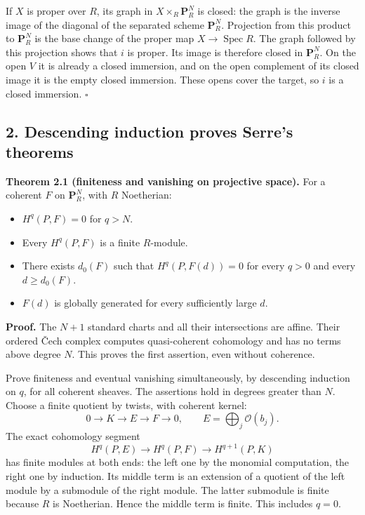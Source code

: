 \documentclass[11pt]{article}
\providecommand{\tightlist}{\setlength{\itemsep}{0pt}\setlength{\parskip}{0pt}}
\begin{document}
If \(X\) is proper over \(R\), its graph in \(X\times_R\mathbf P_R^N\)
is closed: the graph is the inverse image of the diagonal of the
separated scheme \(\mathbf P_R^N\). Projection from this product to
\(\mathbf P_R^N\) is the base change of the proper map
\(X\to\operatorname{Spec}R\). The graph followed by this projection
shows that \(i\) is proper. Its image is therefore closed in
\(\mathbf P_R^N\). On the open \(V\) it is already a closed immersion,
and on the open complement of its closed image it is the empty closed
immersion. These opens cover the target, so \(i\) is a closed immersion.
\(\square\)

\subsection{2. Descending induction proves Serre's
theorems}\label{descending-induction-proves-serres-theorems}

\textbf{Theorem 2.1 (finiteness and vanishing on projective space).} For
a coherent \(F\) on \(\mathbf P_R^N\), with \(R\) Noetherian:

\begin{itemize}
\tightlist
\item
  \(H^q(P,F)=0\) for \(q>N\).
\item
  Every \(H^q(P,F)\) is a finite \(R\)-module.
\item
  There exists \(d_0(F)\) such that \(H^q(P,F(d))=0\) for every \(q>0\)
  and every \(d\ge d_0(F)\).
\item
  \(F(d)\) is globally generated for every sufficiently large \(d\).
\end{itemize}

\textbf{Proof.} The \(N+1\) standard charts and all their intersections
are affine. Their ordered Čech complex computes quasi-coherent
cohomology and has no terms above degree \(N\). This proves the first
assertion, even without coherence.

Prove finiteness and eventual vanishing simultaneously, by descending
induction on \(q\), for all coherent sheaves. The assertions hold in
degrees greater than \(N\). Choose a finite quotient by twists, with
coherent kernel: \[
0\longrightarrow K\longrightarrow E\longrightarrow F\longrightarrow0,
\qquad E=\bigoplus_j\mathcal O(b_j).
\] The exact cohomology segment \[
H^q(P,E)\longrightarrow H^q(P,F)\longrightarrow H^{q+1}(P,K)
\] has finite modules at both ends: the left one by the monomial
computation, the right one by induction. Its middle term is an extension
of a quotient of the left module by a submodule of the right module. The
latter submodule is finite because \(R\) is Noetherian. Hence the middle
term is finite. This includes \(q=0\).
\end{document}
